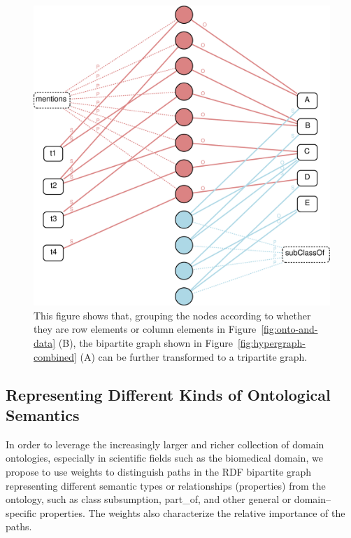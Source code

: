 \begin{figure}[tbh]
\begin{center}
\includegraphics[width=.5\textwidth]{fig/hypergraph_mining-bipartite-weighted.eps}
\end{center}
\caption[Transforming the RDF bipartite graph to suit mining need]{\label{fig:bipartitegraph-weighted} This figure shows that, grouping the nodes according to whether they are row elements or column elements in Figure~\ref{fig:onto-and-data} (B), the bipartite graph shown in Figure~\ref{fig:hypergraph-combined} (A) can be further transformed to a tripartite graph.}
\end{figure}

\subsection{Representing Different Kinds of Ontological Semantics}
\label{sec:rosg}


In order to leverage the increasingly larger and richer collection of domain ontologies, especially in scientific fields such as the biomedical domain, we propose to use weights to distinguish paths in the RDF bipartite graph representing different semantic types or relationships (properties) from the ontology, such as class subsumption, part\_of, and other general or domain--specific properties. The weights also characterize the relative importance of the paths. %

